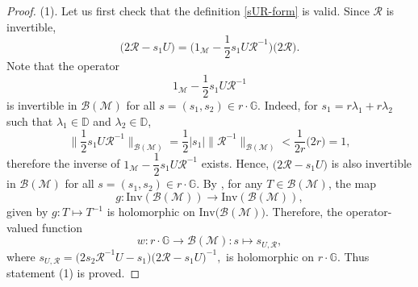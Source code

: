 \documentclass[12pt,reqno]{amsart}
\numberwithin{equation}{section}
\theoremstyle{definition}
\begin{document}
\begin{proof}
(1). Let us first check that the definition \eqref{sUR-form} is valid. Since $\mathcal{R}$ is invertible,
$$\bigg(2\mathcal{R}-s_{1}U\bigg) = \bigg(1_{\mathcal{M}}-\dfrac{1}{2}s_{1}U\mathcal{R}^{-1}\bigg)\bigg(2\mathcal{R}\bigg) .$$
 Note that the operator
$$1_{\mathcal{M}}-\dfrac{1}{2}s_{1}U\mathcal{R}^{-1}$$
is invertible in $\mathcal{B(M)}$ for all $s=(s_{1},s_{2})\in r\cdot\mathbb{G}$. Indeed, for $s_{1}=r \lambda_{1}+r\lambda_{2}$ such that $\lambda_{1}\in \mathbb{D}$ and $\lambda_{2}\in\mathbb{D}$, 
$$ \bigg\| \dfrac{1}{2} s_{1}U\mathcal{R}^{-1}\bigg\|_{\mathcal{B(\mathcal{M})}} = \dfrac{1}{2} \lvert s_{1} \rvert \| \mathcal{R}^{-1} \|_{\mathcal{B(\mathcal{M})}} <  \dfrac{1}{2r}\big(2r\big) = 1,$$
therefore the inverse of $1_{\mathcal{M}}-\dfrac{1}{2}s_{1}U\mathcal{R}^{-1}$ exists. Hence,  $\bigg(2\mathcal{R}-s_{1}U\bigg)$
is also invertible in $\mathcal{B(M)}$ for all $s=(s_{1},s_{2})\in r\cdot\mathbb{G}$.
By  \cite[Proposition I.2.6]{completenormedalgebras}, for any $T\in\mathcal{B(M)}$, the map 
$$g:\mathrm{Inv}(\mathcal{B(M)}) \rightarrow \mathrm{Inv}(\mathcal{B(M)}),$$ 
given by $g:T\mapsto T^{-1}$ is holomorphic on $\mathrm{Inv}(\mathcal{B(M))}$.
Therefore, the operator-valued function
$$w:r\cdot\mathbb{G}\rightarrow \mathcal{B(M)} : s \mapsto s_{U,\mathcal{R}},$$ 
where $s_{U,\mathcal{R}} = \bigg(2s_{2}\mathcal{R}^{-1}U-s_{1}\bigg)\bigg(2\mathcal{R}-s_{1}U\bigg)^{-1},$
is holomorphic on $r\cdot \mathbb{G}$. Thus statement (1) is proved.


\end{proof}
\end{document}
